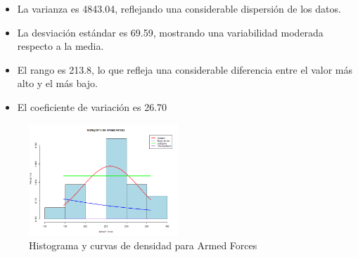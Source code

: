 \documentclass{article}
\begin{document}
\begin{itemize}
\begin{itemize}
\begin{itemize}
                \item La varianza es 4843.04, reflejando una considerable dispersión de los datos.
                \item La desviación estándar es 69.59, mostrando una variabilidad moderada respecto a la media.
                \item El rango es 213.8, lo que refleja una considerable diferencia entre el valor más alto y el más bajo.
                \item El coeficiente de variación es 26.70%
            \end{itemize}
    \end{itemize}
    \begin{figure}[H]
        \centering
        \includegraphics[width=0.5\textwidth]{HistogramasDensidad/histograma_Armed.Forces.png}
        \caption{Histograma y curvas de densidad para Armed Forces}
        \vspace{0.5cm}
    \end{figure}


\end{itemize}
\end{document}
